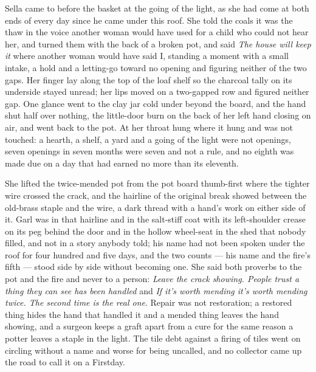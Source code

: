 Sella came to  before the basket at the going of the light, as she had come at both ends of every day since he came under this roof. She told the coals it was the thaw in the voice another woman would have used for a child who could not hear her, and turned them with the back of a broken pot, and said \emph{The house will keep it} where another woman would have said I, standing a moment with a small intake, a hold and a letting-go toward no opening and figuring neither of the two gaps. Her finger lay along the top of the loaf shelf so the charcoal tally on its underside stayed unread; her lips moved on a two-gapped row and figured neither gap. One glance went to the clay jar cold under  beyond the board, and the hand shut half over nothing, the little-door burn on the back of her left hand closing on air, and went back to the pot. At her throat  hung where it hung and was not touched: a hearth, a shelf, a yard and a going of the light were not openings, seven openings in seven months were seven and not a rule, and no eighth was made due on a day that had earned no more than its eleventh.

She lifted the twice-mended pot from the pot board thumb-first where the tighter wire crossed the crack, and the hairline of the original break showed between the old-brass staple and the wire, a dark thread with a hand's work on either side of it. Garl was in that hairline and in the salt-stiff coat with its left-shoulder crease on its peg behind the door and in the hollow wheel-seat in the shed that nobody filled, and not in a story anybody told; his name had not been spoken under the roof for four hundred and five days, and the two counts --- his name and the fire's fifth --- stood side by side without becoming one. She said both proverbs to the pot and the fire and never to a person: \emph{Leave the crack showing. People trust a thing they can see has been handled} and \emph{If it's worth mending it's worth mending twice. The second time is the real one}. Repair was not restoration; a restored thing hides the hand that handled it and a mended thing leaves the hand showing, and a surgeon keeps a graft apart from a cure for the same reason a potter leaves a staple in the light. The tile debt against a firing of tiles went on circling without a name and worse for being uncalled, and no collector came up the road to call it on a Firstday.

